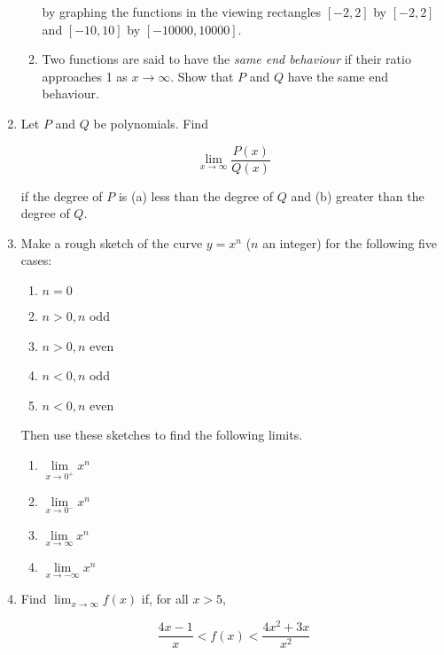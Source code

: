 \documentclass{article}
\begin{document}
\begin{enumerate}
\begin{enumerate}
			by graphing the functions in the viewing rectangles
			$[-2, 2]$ by $[-2,2]$ and $[-10, 10]$ by $[-10000, 10000]$.

			\item Two functions are said to have the \emph{same end behaviour} if their
			ratio approaches 1 as $x \to \infty$. Show that $P$ and $Q$ have the same end
			behaviour.
		\end{enumerate}

		\item Let $P$ and $Q$ be polynomials. Find

			$$\lim \limits _{x \to \infty} \frac{P(x)}{Q(x)}$$

			if the degree of $P$ is (a) less than the degree of $Q$ and (b) greater than the
			degree of $Q$.

		\item Make a rough sketch of the curve $y = x^n$ ($n$ an integer) for the following five
			cases:

			\begin{enumerate}
				\item $ n = 0$

				\item $n > 0, n$ odd

				\item $n > 0, n$ even

				\item $n < 0, n$ odd

				\item $n < 0, n$ even
			\end{enumerate}	

			Then use these sketches to find the following limits.

			\begin{enumerate}
				\item $\lim \limits _{x \to 0^{+}} x^{n}$

				\item $\lim \limits _{x \to 0^{-}} x^{n}$

				\item $\lim \limits _{x \to \infty} x^{n}$

				\item $\lim \limits _{x \to -\infty} x^{n}$
			\end{enumerate}

		\item Find $\lim _{x \to \infty} f(x)$ if, for all $x > 5$,

			$$\frac{4x - 1}{x} < f(x) < \frac{4x^2 + 3x}{x^2}$$


\end{enumerate}
\end{document}
